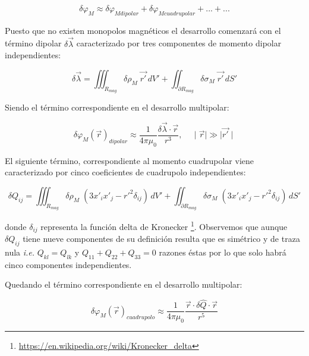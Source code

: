 \begin{equation}
	\label{eq:DesarrolloMultipolar}
	\delta\varphi_{M} \approx \delta\varphi_{M dipolar} + \delta\varphi_{M cuadrupolar} + . . . + . . . 
\end{equation}

Puesto que no existen monopolos magnéticos el desarrollo comenzará con el término dipolar $\delta\vec{\lambda}$ caracterizado por tres componentes de momento dipolar independientes:

\begin{equation}
	\label{eq:Dipolo}
	\delta\vec{\lambda} = \iiint_{R_{mag}} \delta\rho_{M}\; \vec{r'} \,dV' + 
	\iint_{\partial R_{mag}} \delta\sigma_{M}\;  \vec{r'} \,dS'
\end{equation}

Siendo el término correspondiente en el desarrollo multipolar: 

\begin{equation}
	\label{eq:GaussGreenDipolo}
	\delta\varphi_{M}(\vec{r})_{dipolar} \approx \dfrac{1}{4\pi\mu_{0}} \dfrac{\delta\vec{\lambda} \cdot \vec{r}}{r^3}
	, \;\;\;\; \mid \vec{r} \mid \gg \mid \vec{r'} \mid 
\end{equation}



El siguiente término, correspondiente al momento cuadrupolar viene caracterizado por cinco coeficientes de cuadrupolo independientes:

\begin{equation}
	\label{eq:Cuadrupolo}
	\delta Q_{ij} = \iiint_{R_{mag}} \delta\rho_{M}\;  \left( 3 x'_{i}x'_{j}-r'^2 \delta_{ij} \right) \,dV' + 
	\iint_{\partial R_{mag}} \delta\sigma_{M}\;  \left( 3 x'_{i}x'_{j}-r'^2 \delta_{ij} \right) \,dS'
\end{equation}

donde $\delta_{ij}$ representa la función delta de Kronecker \footnote{\url{https://en.wikipedia.org/wiki/Kronecker\_delta}}. Observemos que aunque $\delta Q_{ij}$ tiene nueve componentes de su definición resulta que es simétrico y de traza nula \textit{i.e.} $Q_{kl}=Q_{lk}$ y $Q_{11}+Q_{22}+Q_{33}=0 $ razones éstas por lo que solo habrá cinco componentes independientes.

Quedando el término correspondiente en el desarrollo multipolar: 

\begin{equation}
	\label{eq:GaussGreenCuadrupolo}
	\delta\varphi_{M}(\vec{r})_{cuadrupolo} \approx 
	\dfrac{1}{4\pi\mu_{0}} 
	\dfrac{\vec{r} \cdot \delta\hat{Q} \cdot \vec{r}}{r^5}
\end{equation}

